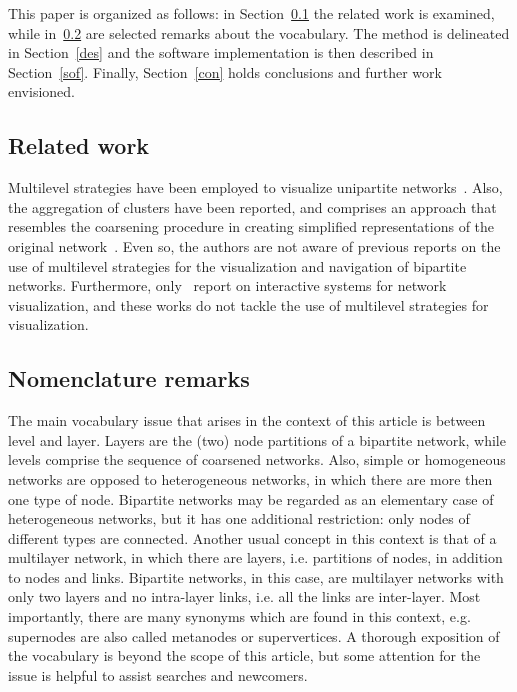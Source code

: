 \documentclass[runningheads]{llncs}
\begin{document}
This paper is organized as follows: in Section~\ref{rel} the related work is examined,
while in~\ref{nom} are selected remarks about the vocabulary.
The method is delineated in Section~\ref{des} and
the software implementation is then described in Section~\ref{sof}.
Finally, Section~\ref{con} holds conclusions and further work envisioned.

\subsection{Related work}\label{rel}
Multilevel strategies have been employed to visualize unipartite networks~\cite{u1,u2,u3,u4,u5,u6,u7}.
Also, the aggregation of clusters have been reported, and comprises an approach that resembles
the coarsening procedure in creating simplified representations of the original network~\cite{a1,a2,a3,a4,a5,a6}.
Even so, the authors are not aware of previous reports on the use of multilevel strategies
for the visualization and navigation of bipartite networks.
Furthermore, only~\cite{a1,a2,a3,a4,a6} report on interactive systems for network visualization,
and these works do not tackle the use of multilevel strategies for visualization.

\subsection{Nomenclature remarks}\label{nom}
The main vocabulary issue that arises in the context of this article is between
level and layer. Layers are the (two) node partitions of a bipartite network, while levels comprise the sequence
of coarsened networks.
Also, simple or homogeneous networks are opposed to heterogeneous networks, in which there
are more then one type of node.
Bipartite networks may be regarded as an elementary case of heterogeneous networks,
but it has one additional restriction: only nodes of different types are connected.
Another usual concept in this context is that of a multilayer network, in which there are layers,
i.e. partitions of nodes, in addition to nodes and links.
Bipartite networks, in this case, are multilayer networks with only two layers and no intra-layer links, i.e. all the links are inter-layer.
Most importantly, there are many synonyms which are found in this context, e.g. supernodes are also called metanodes or supervertices.
A thorough exposition of the vocabulary is beyond the scope of this article, but
some attention for the issue is helpful to assist searches and newcomers.
\end{document}
